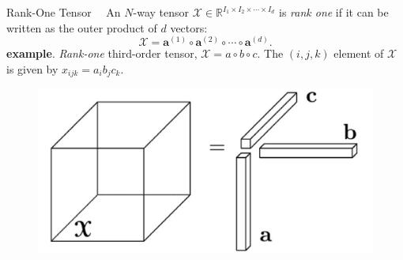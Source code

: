 \documentclass[t, 10pt, handout, aspectratio=169]{beamer}
\begin{document}
\begin{frame}{Rank-One Tensor}
~~An $N$-way tensor $\mathcal{X}\in\mathbb{R}^{I_1\times I_2\times\cdots\times I_d}$ is \textit{rank one} if it can be written as the outer product of $d$ vectors:
$$
\mathcal{X}=\mathbf{a}^{(1)}\circ\mathbf{a}^{(2)}\circ\cdots\circ\mathbf{a}^{(d)}.
$$
\textbf{example}. \textit{Rank-one} third-order tensor, $\mathcal{X} = a \circ b \circ c$. The $(i, j, k)$ element of $\mathcal{X}$ is given by $x_{ijk} = a_ib_jc_k$.
\begin{figure}
	\centering  
	\includegraphics[width=0.45\linewidth]{figs/rankone_tensor.png}\\
	\label{fig:rankone_tensor}
\end{figure}
\end{frame}
\end{document}
